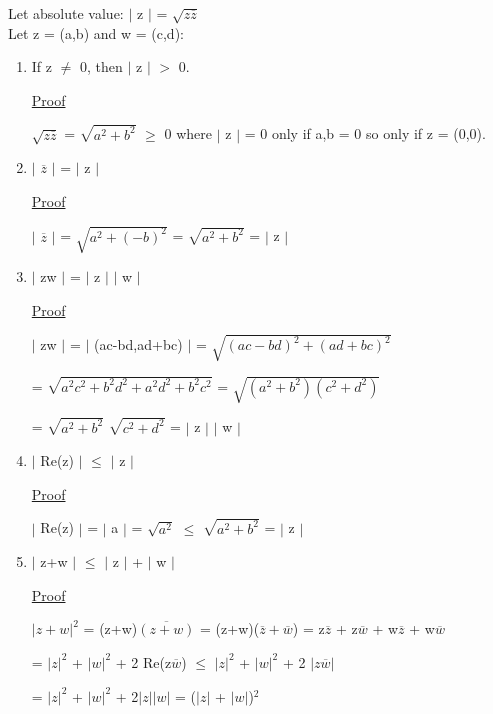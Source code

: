 	\qquad Let absolute value: $|$ z $|$ = $\sqrt{z \overline{z}}$ \\

	\qquad Let z = (a,b) and w = (c,d):
	\begin{enumerate}[label=(\alph*), leftmargin=2cm, itemsep=0.4em]
		\item If z $\neq$ 0, then $|$ z $|$ $>$ 0.

			{ \color{magenta} \underline{Proof} } 
			
				$\sqrt{z\overline{z}}$ = $\sqrt{a^2 + b^2}$ $\geq$ 0
				where $|$ z $|$ = 0 only if a,b = 0 so only if z = (0,0).

		\item $|$ $\overline{z}$ $|$ = $|$ z  $|$

			{ \color{magenta} \underline{Proof} } 
			
				$|$ $\overline{z}$ $|$ = $\sqrt{a^2 + (-b)^2}$ = $\sqrt{a^2 + b^2}$ = $|$ z $|$

		\item $|$ zw $|$ = $|$ z $|$ $|$ w $|$

			{ \color{magenta} \underline{Proof} } 
			
				$|$ zw $|$ = $|$ (ac-bd,ad+bc) $|$ = $\sqrt{(ac-bd)^2 + (ad+bc)^2}$
			
				= $\sqrt{a^2c^2 + b^2d^2 + a^2d^2 + b^2c^2}$
				= $\sqrt{(a^2+b^2)(c^2+d^2)}$

				= $\sqrt{a^2+b^2}$ $\sqrt{c^2+d^2}$ = $|$ z $|$ $|$ w $|$

		\item $|$ Re(z) $|$ $\leq$ $|$ z $|$

			{ \color{magenta} \underline{Proof} } 
			
				$|$ Re(z) $|$ = $|$ a $|$ = $\sqrt{a^2}$ $\leq$ $\sqrt{a^2+b^2}$ = $|$ z $|$

		\item $|$ z+w $|$ $ \leq $  $|$ z $|$ + $|$ w $|$

			{ \color{magenta} \underline{Proof} } 
			
				$| z+w |^2$ = (z+w)$\overline{(z+w)}$ = (z+w)($\overline{z} + \overline{w}$)
				= z$\overline{z}$ + z$\overline{w}$ + w$\overline{z}$ + w$\overline{w}$
			
				= $|z|^2$ + $|w|^2$ + 2 Re(z$\overline{w}$)
				$\leq$ $|z|^2$ + $|w|^2$ + 2 $|z\overline{w}|$

				= $|z|^2$ + $|w|^2$ + 2$|z||w|$
				= ($|z|$ + $|w|$)$^2$
	\end{enumerate}


